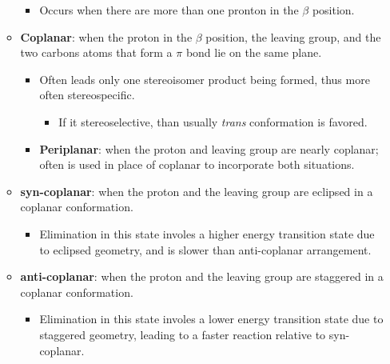 \documentclass[12pt,a4paper]{article}
\begin{document}
\begin{itemize}
\begin{itemize}
\begin{itemize}
                \item Occurs when there are {\color{o-Sun}more than one pronton in the $\beta$ position}.
            \end{itemize}
        \item \textbf{Coplanar}: when the proton in the $\beta$ position, the leaving group, and the two carbons atoms that form a $\pi$ bond lie on the same plane.
            \begin{itemize}
                \item Often leads only one stereoisomer product being formed, thus more often stereospecific.
                    \begin{itemize}
                        \item If it stereoselective, than usually \textit{trans} conformation is favored.
                    \end{itemize}
                \item \textbf{Periplanar}: when the proton and leaving group are {\color{o-Sun}nearly} coplanar; often is used in place of coplanar to incorporate both situations.
            \end{itemize}
        \item \textbf{syn-coplanar}: when the proton and the leaving group are {\color{o-Sun} eclipsed} in a coplanar conformation.
            \begin{itemize}
                \item Elimination in this state involes a higher energy transition state due to eclipsed geometry, and is {\color{o-Sun}slower} than anti-coplanar arrangement.
            \end{itemize}
        \item \textbf{anti-coplanar}: when the proton and the leaving group are {\color{o-Sun}staggered} in a coplanar conformation.
            \begin{itemize}
                \item Elimination in this state involes a lower energy transition state due to staggered geometry, leading to a {\color{o-Sun}faster} reaction relative to syn-coplanar.
            \end{itemize}
    \end{itemize}
\end{itemize}
\end{document}
